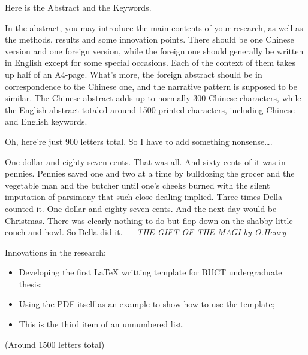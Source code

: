 \begin{eabstract}
	Here is the Abstract and the Keywords.

	In the abstract, you may introduce the main contents of your research,
	as well as the methods, results and some innovation points. There should
	be one Chinese version and one foreign version, while the foreign one
	should generally be written in English except for some special occasions.
	Each of the context of them takes up half of an A4-page. What's more,
	the foreign abstract should be in correspondence to the Chinese one,
	and the narrative pattern is supposed to be similar. The Chinese abstract
	adds up to normally 300 Chinese characters, while the English abstract
	totaled around 1500 printed characters, including Chinese and English keywords.

	Oh, here're just 900 letters total. So I have to add something nonsense\dots.

	One dollar and eighty-seven cents. That was all. And sixty cents of it was
	in pennies. Pennies saved one and two at a time by bulldozing the grocer
	and the vegetable man and the butcher until one's cheeks burned with the
	silent imputation of parsimony that such close dealing implied. Three times
	Della counted it. One dollar and eighty-seven cents. And the next day would
	be Christmas. There was clearly nothing to do but flop down on the shabby
	little couch and howl. So Della did it.
	\hfill --- \textit{THE GIFT OF THE MAGI by O.Henry}

	Innovations in the research:
	\begin{itemize}
		\item Developing the first \LaTeX{} writting template for BUCT undergraduate thesis;
		\item Using the PDF itself as an example to show how to use the template;
		\item This is the third item of an unnumbered list.
	\end{itemize}

	(Around 1500 letters total)
\end{eabstract}